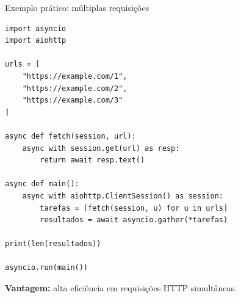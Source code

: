 \documentclass{beamer}
\begin{document}
\begin{frame}[fragile]{Exemplo prático: múltiplas requisições}
    
    \begin{verbatim}
import asyncio
import aiohttp

urls = [
    "https://example.com/1",
    "https://example.com/2",
    "https://example.com/3"
]

async def fetch(session, url):
    async with session.get(url) as resp:
        return await resp.text()

async def main():
    async with aiohttp.ClientSession() as session:
        tarefas = [fetch(session, u) for u in urls]
        resultados = await asyncio.gather(*tarefas)

print(len(resultados))

asyncio.run(main())
    \end{verbatim}
    
    \textbf{Vantagem:} alta eficiência em requisições HTTP simultâneas.
    
\end{frame}
\end{document}
